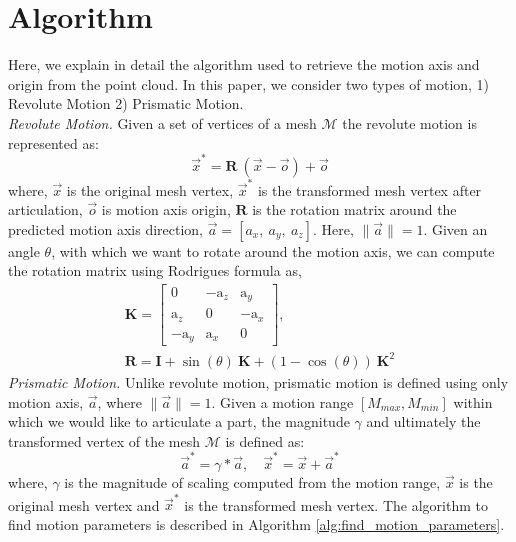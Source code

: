 \section{Algorithm} Here, we explain in detail the algorithm used to retrieve the motion axis and origin from the point cloud. In this paper, we consider two types of motion, 1) Revolute Motion 2) Prismatic Motion. 
\\
\emph{Revolute Motion.} Given a set of vertices of a mesh  $\mathcal{M}$ the revolute motion is represented as: 
\begin{equation}
    \Vec{x}^{*} = \mathbf{R} \ (\Vec{x} - \Vec{o}) + \Vec{o}
    \label{eq: revolute_motion}
\end{equation}
where, $\Vec{x}$ is the original mesh vertex, $\Vec{x}^{*}$ is the transformed mesh vertex after articulation, $\Vec{o}$ is motion axis origin, $\mathbf{R}$ is the rotation matrix around the predicted motion axis direction, $\Vec{a}=[a_{x},\ a_{y},\ a_{z}]$. Here, $\|\Vec{a}\|=1$. Given an angle $\theta$, with which we want to rotate around the motion axis, we can compute the rotation matrix using Rodrigues formula as,
\begin{gather}
\mathbf{K} =
\begin{bmatrix}
0 & -\text{a}_z & \text{a}_y \\
\text{a}_z & 0 & -\text{a}_x \\
-\text{a}_y & \text{a}_x & 0
\end{bmatrix}, \\
\mathbf{R} = \mathbf{I} + \sin(\theta) \ \mathbf{K} + (1 - \cos(\theta)) \ \mathbf{K}^2
\end{gather}
\emph{Prismatic Motion.} Unlike revolute motion, prismatic motion is defined using only motion axis, $\Vec{a}$, where $\|\Vec{a}\|=1$. Given a motion range $[M_{max}, M_{min}]$ within which we would like to articulate a part, the magnitude $\gamma$ and ultimately the transformed vertex of the mesh $\mathcal{M}$ is defined as:
\begin{equation}
    \Vec{a}^{*} = \gamma * \Vec{a}, \quad \Vec{x}^{*} = \Vec{x} + \Vec{a}^{*}
    \label{eq: prismatic_motion}
\end{equation}
where, $\gamma$ is the magnitude of scaling computed from the motion range, $\Vec{x}$ is the original mesh vertex and $\Vec{x}^{*}$ is the transformed mesh vertex. The algorithm to find motion parameters is described in Algorithm \ref{alg:find_motion_parameters}.

